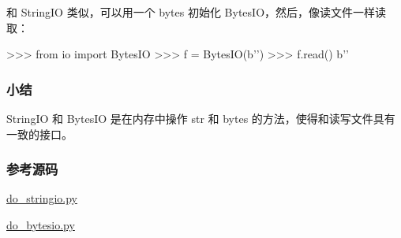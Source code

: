 和 StringIO 类似，可以用一个 bytes 初始化
BytesIO，然后，像读文件一样读取：

\begin{pythoncode}
>>> from io import BytesIO
>>> f = BytesIO(b'\xad{}')
>>> f.read()
b'\xad{}'
\end{pythoncode}

\hypertarget{ux5c0fux7ed3}{%
\subsubsection{小结}\label{ux5c0fux7ed3}}

StringIO 和 BytesIO 是在内存中操作 str 和 bytes
的方法，使得和读写文件具有一致的接口。

\hypertarget{ux53c2ux8003ux6e90ux7801}{%
\subsubsection{参考源码}\label{ux53c2ux8003ux6e90ux7801}}

\href{https://github.com/michaelliao/learn-python3/blob/master/samples/io/do_stringio.py}{do\_stringio.py}

\href{https://github.com/michaelliao/learn-python3/blob/master/samples/io/do_bytesio.py}{do\_bytesio.py}

